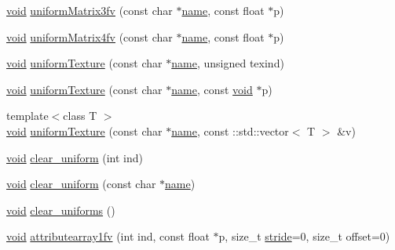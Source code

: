 \begin{DoxyCompactItemize}
\hyperlink{namespacetrimesh_a784ddfd979e1c579bda795a8edfc3f43}{void} \hyperlink{classtrimesh_1_1GLManager_a8148eb6de9963331b5335fe4ff0f6b5b}{uniform\+Matrix3fv} (const char $\ast$\hyperlink{namespacetrimesh_a7f24cdcfa73387d7fa6aa44676238a79}{name}, const float $\ast$p)
\item 
\hyperlink{namespacetrimesh_a784ddfd979e1c579bda795a8edfc3f43}{void} \hyperlink{classtrimesh_1_1GLManager_a89fc85ec35633b813c4eaa18f9689bce}{uniform\+Matrix4fv} (const char $\ast$\hyperlink{namespacetrimesh_a7f24cdcfa73387d7fa6aa44676238a79}{name}, const float $\ast$p)
\item 
\hyperlink{namespacetrimesh_a784ddfd979e1c579bda795a8edfc3f43}{void} \hyperlink{classtrimesh_1_1GLManager_a4df4439932f0fd370eb60bb2d35798fb}{uniform\+Texture} (const char $\ast$\hyperlink{namespacetrimesh_a7f24cdcfa73387d7fa6aa44676238a79}{name}, unsigned texind)
\item 
\hyperlink{namespacetrimesh_a784ddfd979e1c579bda795a8edfc3f43}{void} \hyperlink{classtrimesh_1_1GLManager_a5f5152237eaa447b35face9b1c63089f}{uniform\+Texture} (const char $\ast$\hyperlink{namespacetrimesh_a7f24cdcfa73387d7fa6aa44676238a79}{name}, const \hyperlink{namespacetrimesh_a784ddfd979e1c579bda795a8edfc3f43}{void} $\ast$p)
\item 
{\footnotesize template$<$class T $>$ }\\\hyperlink{namespacetrimesh_a784ddfd979e1c579bda795a8edfc3f43}{void} \hyperlink{classtrimesh_1_1GLManager_a8a8b47ea5efc1a284e868a524913e00d}{uniform\+Texture} (const char $\ast$\hyperlink{namespacetrimesh_a7f24cdcfa73387d7fa6aa44676238a79}{name}, const \+::std\+::vector$<$ T $>$ \&v)
\item 
\hyperlink{namespacetrimesh_a784ddfd979e1c579bda795a8edfc3f43}{void} \hyperlink{classtrimesh_1_1GLManager_a4683485affd669dc35000794bf2d507c}{clear\+\_\+uniform} (int ind)
\item 
\hyperlink{namespacetrimesh_a784ddfd979e1c579bda795a8edfc3f43}{void} \hyperlink{classtrimesh_1_1GLManager_a080cfb98fd371dcc43d8ae7a4eed5b33}{clear\+\_\+uniform} (const char $\ast$\hyperlink{namespacetrimesh_a7f24cdcfa73387d7fa6aa44676238a79}{name})
\item 
\hyperlink{namespacetrimesh_a784ddfd979e1c579bda795a8edfc3f43}{void} \hyperlink{classtrimesh_1_1GLManager_a06242b954d4426b0c9cbc3eefbfcfe0b}{clear\+\_\+uniforms} ()
\item 
\hyperlink{namespacetrimesh_a784ddfd979e1c579bda795a8edfc3f43}{void} \hyperlink{classtrimesh_1_1GLManager_a2c0409e89223680c753657614cb4d05a}{attributearray1fv} (int ind, const float $\ast$p, size\+\_\+t \hyperlink{namespacetrimesh_adbcc86014e77656be1a9df7ecaae5f2f}{stride}=0, size\+\_\+t offset=0)

\end{DoxyCompactItemize}
